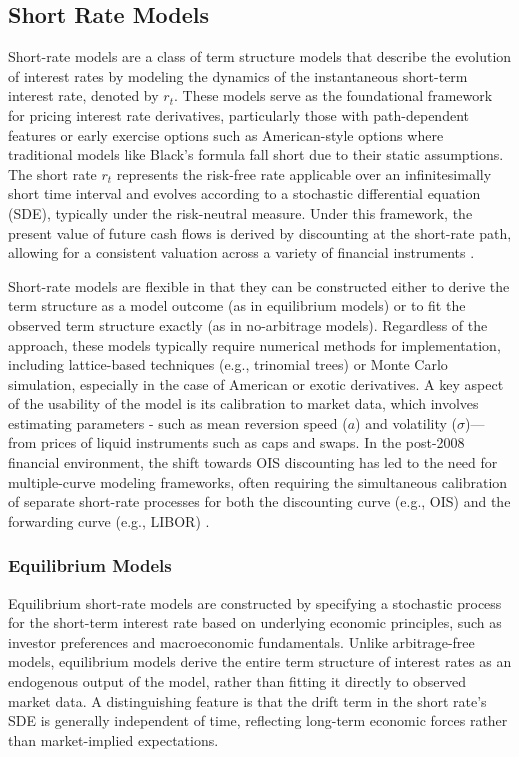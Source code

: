 \subsection{Short Rate Models} \label{short_rate_models}
Short-rate models are a class of term structure models that describe the evolution of interest rates by modeling the dynamics of the instantaneous short-term interest rate, denoted by $r_{t}$. These models serve as the foundational framework for pricing interest rate derivatives, particularly those with path-dependent features or early exercise options such as American-style options where traditional models like Black's formula fall short due to their static assumptions. The short rate $r_{t}$ represents the risk-free rate applicable over an infinitesimally short time interval and evolves according to a stochastic differential equation (SDE), typically under the risk-neutral measure. Under this framework, the present value of future cash flows is derived by discounting at the short-rate path, allowing for a consistent valuation across a variety of financial instruments \parencite[pp.~706--735]{hull2015optionsfutures}. 

Short-rate models are flexible in that they can be constructed either to derive the term structure as a model outcome (as in equilibrium models) or to fit the observed term structure exactly (as in no-arbitrage models). Regardless of the approach, these models typically require numerical methods for implementation, including lattice-based techniques (e.g., trinomial trees) or Monte Carlo simulation, especially in the case of American or exotic derivatives. A key aspect of the usability of the model is its calibration to market data, which involves estimating parameters - such as mean reversion speed ($a$) and volatility ($\sigma$)—from prices of liquid instruments such as caps and swaps. In the post-2008 financial environment, the shift towards OIS discounting has led to the need for multiple-curve modeling frameworks, often requiring the simultaneous calibration of separate short-rate processes for both the discounting curve (e.g., OIS) and the forwarding curve (e.g., LIBOR) \parencite[pp.~706--735]{hull2015optionsfutures}.

\subsubsection{Equilibrium Models} \label{equilibrium_models}
Equilibrium short-rate models are constructed by specifying a stochastic process for the short-term interest rate based on underlying economic principles, such as investor preferences and macroeconomic fundamentals. Unlike arbitrage-free models, equilibrium models derive the entire term structure of interest rates as an endogenous output of the model, rather than fitting it directly to observed market data. A distinguishing feature is that the drift term in the short rate's SDE is generally independent of time, reflecting long-term economic forces rather than market-implied expectations.

